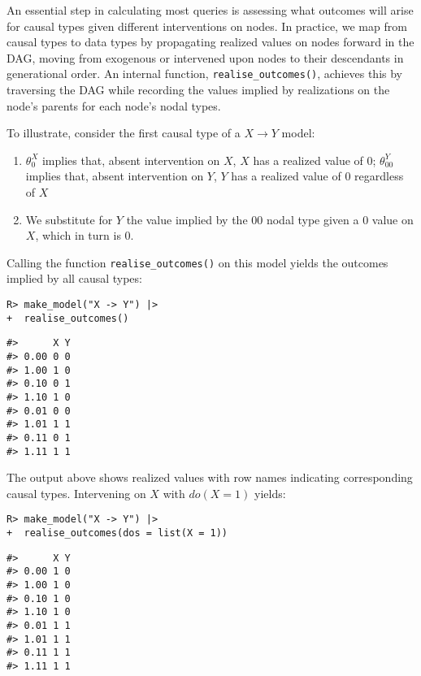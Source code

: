 \documentclass[
  11pt,
  article]{jss}
\providecommand{\tightlist}{%
  \setlength{\itemsep}{0pt}\setlength{\parskip}{0pt}}\usepackage{longtable,booktabs,array}
\begin{document}
An essential step in calculating most queries is assessing what outcomes
will arise for causal types given different interventions on nodes. In
practice, we map from causal types to data types by propagating realized
values on nodes forward in the DAG, moving from exogenous or intervened
upon nodes to their descendants in generational order. An internal
function, \texttt{realise\_outcomes()}, achieves this by traversing the
DAG while recording the values implied by realizations on the node's
parents for each node's nodal types.

To illustrate, consider the first causal type of a \(X \rightarrow Y\)
model:

\begin{enumerate}
\def\labelenumi{\arabic{enumi}.}
\tightlist
\item
  \(\theta^X_0\) implies that, absent intervention on \(X\), \(X\) has a
  realized value of \(0\); \(\theta^Y_{00}\) implies that, absent
  intervention on \(Y\), \(Y\) has a realized value of \(0\) regardless
  of \(X\)
\item
  We substitute for \(Y\) the value implied by the \(00\) nodal type
  given a \(0\) value on \(X\), which in turn is \(0\).
\end{enumerate}

Calling the function \texttt{realise\_outcomes()} on this model yields
the outcomes implied by all causal types:

\begin{verbatim}
R> make_model("X -> Y") |> 
+  realise_outcomes()
\end{verbatim}

\begin{verbatim}
#>      X Y
#> 0.00 0 0
#> 1.00 1 0
#> 0.10 0 1
#> 1.10 1 0
#> 0.01 0 0
#> 1.01 1 1
#> 0.11 0 1
#> 1.11 1 1
\end{verbatim}

The output above shows realized values with row names indicating
corresponding causal types. Intervening on \(X\)
\citep[see][]{pearl_causality_2009} with \(do(X=1)\) yields:

\begin{verbatim}
R> make_model("X -> Y") |> 
+  realise_outcomes(dos = list(X = 1))
\end{verbatim}

\begin{verbatim}
#>      X Y
#> 0.00 1 0
#> 1.00 1 0
#> 0.10 1 0
#> 1.10 1 0
#> 0.01 1 1
#> 1.01 1 1
#> 0.11 1 1
#> 1.11 1 1
\end{verbatim}
\end{document}
